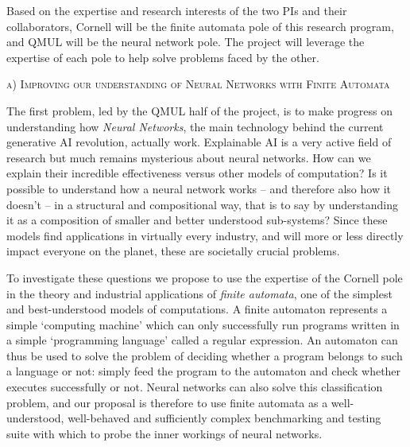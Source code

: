 \documentclass[10pt,a4paper]{article}
\begin{document}
		Based on the expertise and research interests of the two PIs and their collaborators, Cornell will be the finite automata pole of this research program, and QMUL will be the neural network pole. The project will leverage the expertise of each pole to help solve problems faced by the other. 
	
		{
				\vspace{3mm}
				\noindent \textsc{\large a) Improving our understanding of Neural Networks with Finite Automata}
				\vspace{3mm}
		}
	
		The first problem, led by the QMUL half of the project, is to make progress on understanding how \emph{Neural Networks}, the main technology behind the current generative AI revolution, actually work. Explainable AI is a very active field of research but much remains mysterious about neural networks. How can we explain their incredible effectiveness versus other models of computation? Is it possible to understand how a neural network works -- and therefore also how it doesn't -- in a structural and compositional way, that is to say by understanding it as a composition of smaller and better understood sub-systems? Since these models find applications in virtually every industry, and will more or less directly impact everyone on the planet, these are societally crucial problems. 
		
		To investigate these questions we propose to use the expertise of the Cornell pole in the theory and industrial applications of \emph{finite automata}, one of the simplest and best-understood models of computations. A finite automaton represents a simple `computing machine' which can only successfully run programs written in a simple `programming language' called a regular expression. An automaton can thus be used to solve the problem of deciding whether a program belongs to such a language or not: simply feed the program to the automaton and check whether executes successfully or not. Neural networks can also solve this classification problem, and our proposal is therefore to use finite automata as a well-understood, well-behaved and sufficiently complex benchmarking and testing suite with which to probe the inner workings of neural networks. 
	
\end{document}
